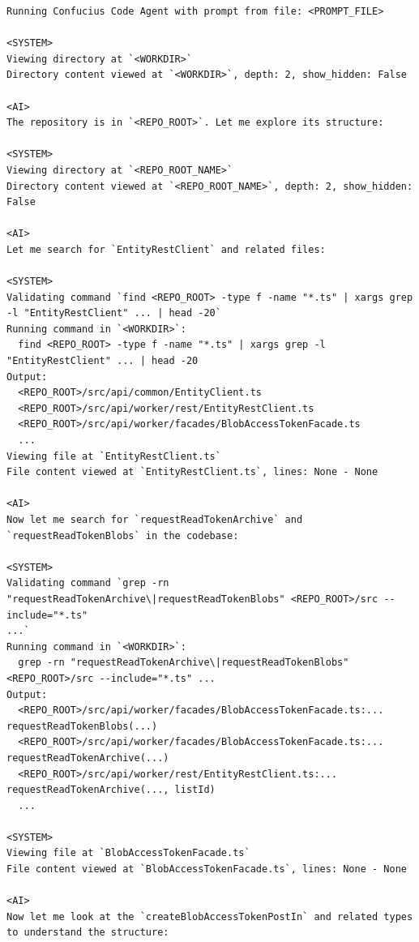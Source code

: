 \begin{tcolorbox}[colback=white,  %
                   colframe=black,    %
                   coltext=metablue,      %
                   breakable,
                   fontupper=\scriptsize\fontfamily{pcr}\selectfont]  %
\begin{verbatim}
Running Confucius Code Agent with prompt from file: <PROMPT_FILE>

<SYSTEM>
Viewing directory at `<WORKDIR>`
Directory content viewed at `<WORKDIR>`, depth: 2, show_hidden: False

<AI>
The repository is in `<REPO_ROOT>`. Let me explore its structure:

<SYSTEM>
Viewing directory at `<REPO_ROOT_NAME>`
Directory content viewed at `<REPO_ROOT_NAME>`, depth: 2, show_hidden: False

<AI>
Let me search for `EntityRestClient` and related files:

<SYSTEM>
Validating command `find <REPO_ROOT> -type f -name "*.ts" | xargs grep -l "EntityRestClient" ... | head -20`
Running command in `<WORKDIR>`:
  find <REPO_ROOT> -type f -name "*.ts" | xargs grep -l "EntityRestClient" ... | head -20
Output:
  <REPO_ROOT>/src/api/common/EntityClient.ts
  <REPO_ROOT>/src/api/worker/rest/EntityRestClient.ts
  <REPO_ROOT>/src/api/worker/facades/BlobAccessTokenFacade.ts
  ...
Viewing file at `EntityRestClient.ts`
File content viewed at `EntityRestClient.ts`, lines: None - None

<AI>
Now let me search for `requestReadTokenArchive` and `requestReadTokenBlobs` in the codebase:

<SYSTEM>
Validating command `grep -rn "requestReadTokenArchive\|requestReadTokenBlobs" <REPO_ROOT>/src --include="*.ts"
...`
Running command in `<WORKDIR>`:
  grep -rn "requestReadTokenArchive\|requestReadTokenBlobs" <REPO_ROOT>/src --include="*.ts" ...
Output:
  <REPO_ROOT>/src/api/worker/facades/BlobAccessTokenFacade.ts:... requestReadTokenBlobs(...)
  <REPO_ROOT>/src/api/worker/facades/BlobAccessTokenFacade.ts:... requestReadTokenArchive(...)
  <REPO_ROOT>/src/api/worker/rest/EntityRestClient.ts:... requestReadTokenArchive(..., listId)
  ...

<SYSTEM>
Viewing file at `BlobAccessTokenFacade.ts`
File content viewed at `BlobAccessTokenFacade.ts`, lines: None - None

<AI>
Now let me look at the `createBlobAccessTokenPostIn` and related types to understand the structure:


\end{verbatim}
\end{tcolorbox}
